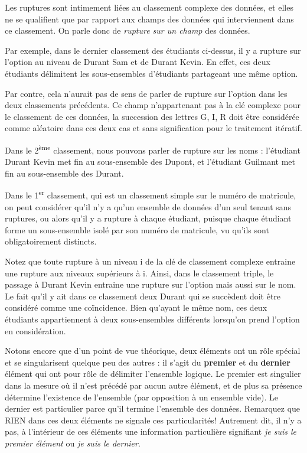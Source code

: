 {
Les ruptures sont intimement liées au classement complexe des données,
et elles ne se qualifient que par rapport aux champs des données qui
interviennent dans ce classement. On parle donc de \textit{rupture sur
un champ} des données.}

{
Par exemple, dans le dernier classement des étudiants ci-dessus, il y a
rupture sur l’option au niveau de Durant Sam et de Durant Kevin. En
effet, ces deux étudiants délimitent les sous-ensembles d’étudiants
partageant une même option.}

{
Par contre, cela n’aurait pas de sens de parler de rupture sur l’option
dans les deux classements précédents. Ce champ n’appartenant pas à la
clé complexe pour le classement de ces données, la succession des
lettres G, I, R doit être considérée comme aléatoire dans ces deux cas
et sans signification pour le traitement itératif.}

{
Dans le 2\textsuperscript{ème} classement, nous pouvons parler de
rupture sur les noms : l’étudiant Durant Kevin met fin au sous-ensemble
des Dupont, et l’étudiant Guilmant met fin au sous-ensemble des Durant.
}

{
Dans le 1\textsuperscript{er} classement, qui est un classement simple
sur le numéro de matricule, on peut considérer qu’il n’y a qu’un
ensemble de données d’un seul tenant sans ruptures, ou alors qu’il y a
rupture à chaque étudiant, puisque chaque étudiant forme un
sous-ensemble isolé par son numéro de matricule, vu qu’ils sont
obligatoirement distincts.}

{
Notez que toute rupture à un niveau i de la clé de classement complexe
entraine une rupture aux niveaux supérieurs à i. Ainsi, dans le
classement triple, le passage à Durant Kevin entraine une rupture sur
l’option mais aussi sur le nom. Le fait qu’il y ait dans ce classement
deux Durant qui se succèdent doit être considéré comme une coïncidence.
Bien qu’ayant le même nom, ces deux étudiants appartiennent à deux
sous-ensembles différents lorsqu’on prend l’option en considération.}

{
Notons encore que d’un point de vue théorique, deux éléments ont un rôle
spécial et se singularisent quelque peu des autres : il s’agit du
\textbf{premier} et du \textbf{dernier} élément qui ont pour rôle de
délimiter l’ensemble logique. Le premier est singulier dans la mesure
où il n’est précédé par aucun autre élément, et de plus sa présence
détermine l’existence de l’ensemble (par opposition à un ensemble
vide). Le dernier est particulier parce qu’il termine l’ensemble des
données. Remarquez que RIEN dans ces deux éléments ne signale ces
particularités! Autrement dit, il n’y a pas, à l’intérieur de ces
éléments une information particulière signifiant \textit{je suis le
premier élément} ou \textit{je suis le dernier}.}


